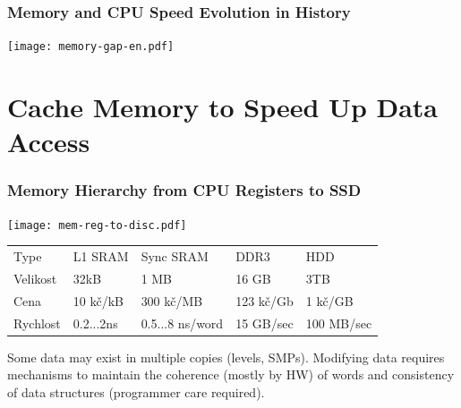 \documentclass{beamer}
\begin{document}
\begin{frame}
\frametitle{Memory and CPU Speed Evolution in History}

\centering

\texttt{[image: memory-gap-en.pdf]}

\end{frame}

\section{Cache Memory to Speed Up Data Access}

\begin{frame}
\frametitle{Memory Hierarchy from CPU Registers to SSD}

{
\centering

\texttt{[image: mem-reg-to-disc.pdf]}

}
\vskip 2mm

\begin{tabular}{l|llll}
Type     & L1 SRAM   & Sync SRAM &  DDR3      & HDD \\
Velikost & 32kB      & 1 MB      &  16 GB     & 3TB \\
Cena     & 10 kč/kB  & 300 kč/MB &  123 kč/Gb & 1 kč/GB \\
Rychlost & 0.2...2ns & 0.5...8 ns/word & 15 GB/sec & 100 MB/sec \\
\end{tabular}

\vskip 2mm

Some data may exist in multiple copies (levels, SMPs).
Modifying data requires mechanisms to maintain the coherence (mostly by HW) of words and consistency of data structures (programmer care required).

\end{frame}
\end{document}
